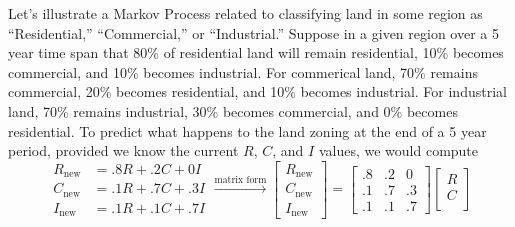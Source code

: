 \begin{example} Let's illustrate a Markov Process related to classifying land in some region as ``Residential,'' ``Commercial,'' or ``Industrial.'' Suppose in a given region over a 5 year time span that 80\% of residential land will remain residential, 10\% becomes commercial, and 10\%  becomes industrial. For commerical land, 70\% remains commercial, 20\% becomes residential, and 10\% becomes industrial.  For industrial land, 70\% remains industrial, 30\% becomes commercial, and 0\% becomes residential.  To predict what happens to the land zoning at the end of a 5 year period, provided we know the current $R$, $C$, and $I$ values, we would compute 
$$
\begin{array}{rl}
R_{\text{new}} &= .8 R+ .2 C+0 I\\ 
C_{\text{new}} &= .1 R+ .7 C+.3 I\\ 
I_{\text{new}} &= .1 R+ .1 C+.7 I 
\end{array}
\xrightarrow{\text{matrix form}}
\begin{bmatrix}
R_{\text{new}}\\ 
C_{\text{new}}\\ 
I_{\text{new}} 
\end{bmatrix}
=
\begin{bmatrix}
.8& .2 &0 \\ 
.1& .7 &.3\\ 
.1& .1 &.7 
\end{bmatrix}
\begin{bmatrix}
R\\ 
C\\ 

\end{bmatrix}$$
\end{example}
